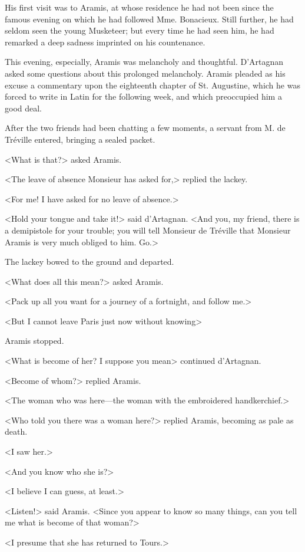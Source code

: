 His first visit was to Aramis, at whose residence he had not been since the famous evening on which he had followed Mme. Bonacieux. Still further, he had seldom seen the young Musketeer; but every time he had seen him, he had remarked a deep sadness imprinted on his countenance. 

This evening, especially, Aramis was melancholy and thoughtful. D'Artagnan asked some questions about this prolonged melancholy. Aramis pleaded as his excuse a commentary upon the eighteenth chapter of St. Augustine, which he was forced to write in Latin for the following week, and which preoccupied him a good deal. 

After the two friends had been chatting a few moments, a servant from M. de Tréville entered, bringing a sealed packet. 

<What is that?> asked Aramis. 

<The leave of absence Monsieur has asked for,> replied the lackey. 

<For me! I have asked for no leave of absence.> 

<Hold your tongue and take it!> said d'Artagnan. <And you, my friend, there is a demipistole for your trouble; you will tell Monsieur de Tréville that Monsieur Aramis is very much obliged to him. Go.> 

The lackey bowed to the ground and departed. 

<What does all this mean?> asked Aramis. 

<Pack up all you want for a journey of a fortnight, and follow me.> 

<But I cannot leave Paris just now without knowing\longdash> 

Aramis stopped. 

<What is become of her? I suppose you mean\longdash> continued d'Artagnan. 

<Become of whom?> replied Aramis. 

<The woman who was here---the woman with the embroidered handkerchief.> 

<Who told you there was a woman here?> replied Aramis, becoming as pale as death. 

<I saw her.> 

<And you know who she is?> 

<I believe I can guess, at least.> 

<Listen!> said Aramis. <Since you appear to know so many things, can you tell me what is become of that woman?> 

<I presume that she has returned to Tours.> 

